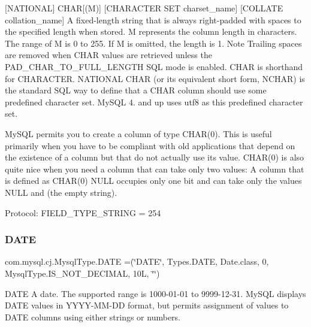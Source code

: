 \mbox{[}N\+A\+T\+I\+O\+N\+AL\mbox{]} C\+H\+AR\mbox{[}(M)\mbox{]} \mbox{[}C\+H\+A\+R\+A\+C\+T\+ER S\+ET charset\+\_\+name\mbox{]} \mbox{[}C\+O\+L\+L\+A\+TE collation\+\_\+name\mbox{]} A fixed-\/length string that is always right-\/padded with spaces to the specified length when stored. M represents the column length in characters. The range of M is 0 to 255. If M is omitted, the length is 1. Note Trailing spaces are removed when C\+H\+AR values are retrieved unless the P\+A\+D\+\_\+\+C\+H\+A\+R\+\_\+\+T\+O\+\_\+\+F\+U\+L\+L\+\_\+\+L\+E\+N\+G\+TH S\+QL mode is enabled. C\+H\+AR is shorthand for C\+H\+A\+R\+A\+C\+T\+ER. N\+A\+T\+I\+O\+N\+AL C\+H\+AR (or its equivalent short form, N\+C\+H\+AR) is the standard S\+QL way to define that a C\+H\+AR column should use some predefined character set. My\+S\+QL 4. and up uses utf8 as this predefined character set.

My\+S\+QL permits you to create a column of type C\+H\+A\+R(0). This is useful primarily when you have to be compliant with old applications that depend on the existence of a column but that do not actually use its value. C\+H\+A\+R(0) is also quite nice when you need a column that can take only two values\+: A column that is defined as C\+H\+A\+R(0) N\+U\+LL occupies only one bit and can take only the values N\+U\+LL and \textquotesingle{}\textquotesingle{} (the empty string).

Protocol\+: F\+I\+E\+L\+D\+\_\+\+T\+Y\+P\+E\+\_\+\+S\+T\+R\+I\+NG = 254 \mbox{\label{enumcom_1_1mysql_1_1cj_1_1_mysql_type_a27b01e95b5b669490e934d7484aa67eb}} 
\subsubsection{\texorpdfstring{D\+A\+TE}{DATE}}
{\footnotesize\ttfamily com.\+mysql.\+cj.\+Mysql\+Type.\+D\+A\+TE =(\char`\"{}D\+A\+TE\char`\"{}, Types.\+D\+A\+TE, Date.\+class, 0, Mysql\+Type.\+I\+S\+\_\+\+N\+O\+T\+\_\+\+D\+E\+C\+I\+M\+AL, 10\+L, \char`\"{}\char`\"{})}

D\+A\+TE A date. The supported range is \textquotesingle{}1000-\/01-\/01\textquotesingle{} to \textquotesingle{}9999-\/12-\/31\textquotesingle{}. My\+S\+QL displays D\+A\+TE values in \textquotesingle{}Y\+Y\+Y\+Y-\/\+M\+M-\/\+DD\textquotesingle{} format, but permits assignment of values to D\+A\+TE columns using either strings or numbers.

